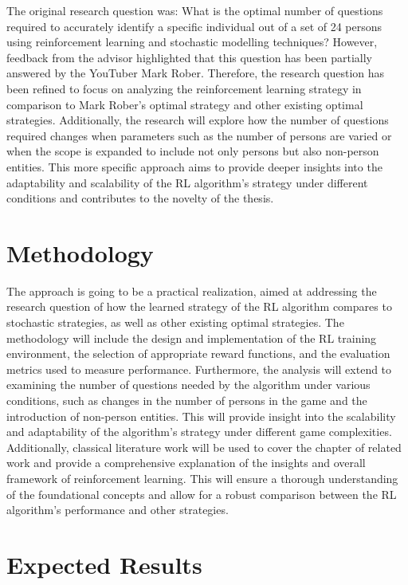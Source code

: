The original research question was: What is the optimal number of questions required to accurately identify a specific individual out of a set of 24 persons using reinforcement learning and stochastic modelling techniques? However, feedback from the advisor highlighted that this question has been partially answered by the YouTuber Mark Rober. Therefore, the research question has been refined to focus on analyzing the reinforcement learning strategy in comparison to Mark Rober's optimal strategy and other existing optimal strategies. Additionally, the research will explore how the number of questions required changes when parameters such as the number of persons are varied or when the scope is expanded to include not only persons but also non-person entities. This more specific approach aims to provide deeper insights into the adaptability and scalability of the RL algorithm's strategy under different conditions and contributes to the novelty of the thesis.


\section{Methodology}

The approach is going to be a practical realization, aimed at addressing the research question of how the learned strategy of the RL algorithm compares to stochastic strategies, as well as other existing optimal strategies. The methodology will include the design and implementation of the RL training environment, the selection of appropriate reward functions, and the evaluation metrics used to measure performance. Furthermore, the analysis will extend to examining the number of questions needed by the algorithm under various conditions, such as changes in the number of persons in the game and the introduction of non-person entities. This will provide insight into the scalability and adaptability of the algorithm’s strategy under different game complexities. Additionally, classical literature work will be used to cover the chapter of related work and provide a comprehensive explanation of the insights and overall framework of reinforcement learning. This will ensure a thorough understanding of the foundational concepts and allow for a robust comparison between the RL algorithm's performance and other strategies.

\section{Expected Results}

